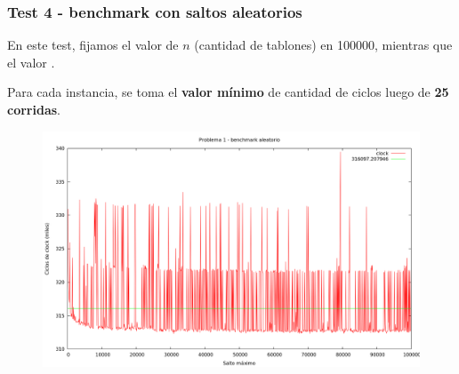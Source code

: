 \newpage


\subsubsection{Test 4 - benchmark con saltos aleatorios}

En este test, fijamos el valor de $n$ (cantidad de tablones) en 100000, mientras que el valor 
.

Para cada instancia, se toma el \textbf{valor mínimo} de cantidad de ciclos luego de \textbf{25 corridas}.


\begin{figure}[h]
  \begin{center}
    \includegraphics[scale=0.35]{imagenes/grafico-1-c.png}
  \end{center}
\end{figure}


